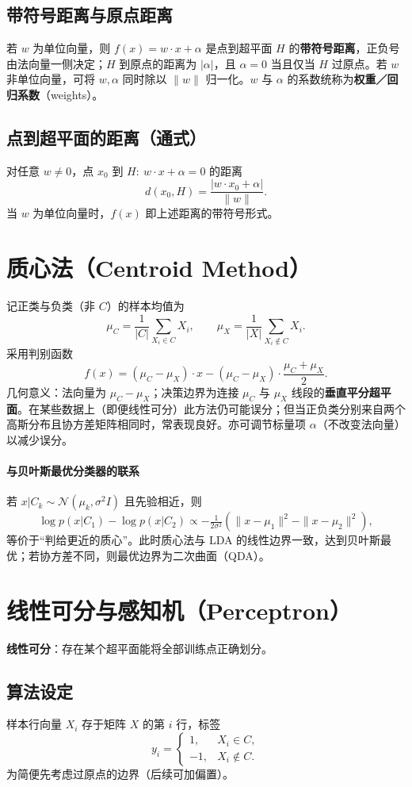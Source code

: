 \documentclass[10.5pt,hyperref,a4paper,UTF8]{ctexart}
\begin{document}
\subsection{带符号距离与原点距离}
若 $w$ 为单位向量，则 $f(x)=w\cdot x+\alpha$ 是点到超平面 $H$ 的\textbf{带符号距离}，正负号由法向量一侧决定；$H$ 到原点的距离为 $|\alpha|$，且 $\alpha=0$ 当且仅当 $H$ 过原点。若 $w$ 非单位向量，可将 $w,\alpha$ 同时除以 $\|w\|$ 归一化。$w$ 与 $\alpha$ 的系数统称为\textbf{权重／回归系数}（weights）。

\subsection{点到超平面的距离（通式）}
对任意 $w\ne 0$，点 $x_0$ 到 $H:\ w\cdot x+\alpha=0$ 的距离
\[
d(x_0,H)=\frac{|w\cdot x_0+\alpha|}{\|w\|}.
\]
当 $w$ 为单位向量时，$f(x)$ 即上述距离的带符号形式。

\section{质心法（Centroid Method）}
记正类与负类（非 $C$）的样本均值为
\[
\mu_C=\frac{1}{|C|}\sum_{X_i\in C}X_i,\qquad
\mu_X=\frac{1}{|X|}\sum_{X_i\notin C}X_i.
\]
采用判别函数
\[
f(x)=(\mu_C-\mu_X)\cdot x-(\mu_C-\mu_X)\cdot\frac{\mu_C+\mu_X}{2}.
\]
几何意义：法向量为 $\mu_C-\mu_X$；决策边界为连接 $\mu_C$ 与 $\mu_X$ 线段的\textbf{垂直平分超平面}。在某些数据上（即便线性可分）此方法仍可能误分；但当正负类分别来自两个高斯分布且协方差矩阵相同时，常表现良好。亦可调节标量项 $\alpha$（不改变法向量）以减少误分。

\paragraph{与贝叶斯最优分类器的联系}
若 $x|C_k\sim \mathcal{N}(\mu_k,\sigma^2 I)$ 且先验相近，则
\[
\log p(x|C_1)-\log p(x|C_2)\propto
-\tfrac{1}{2\sigma^2}\!\left(\|x-\mu_1\|^2-\|x-\mu_2\|^2\right),
\]
等价于“判给更近的质心”。此时质心法与 LDA 的线性边界一致，达到贝叶斯最优；若协方差不同，则最优边界为二次曲面（QDA）。

\section{线性可分与感知机（Perceptron）}
\textbf{线性可分}：存在某个超平面能将全部训练点正确划分。

\subsection{算法设定}
样本行向量 $X_i$ 存于矩阵 $X$ 的第 $i$ 行，标签
\[
y_i=\begin{cases}
1,& X_i\in C,\\
-1,& X_i\notin C.
\end{cases}
\]
为简便先考虑过原点的边界（后续可加偏置）。
\end{document}
